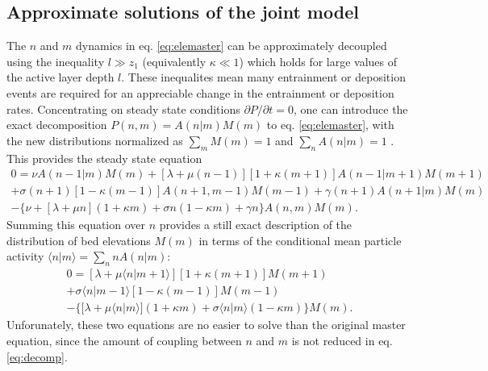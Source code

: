 \subsection{Approximate solutions of the joint model}
\label{sec:eleanalytical}

The $n$ and $m$ dynamics in eq. \ref{eq:elemaster} can be approximately decoupled using the inequality $l \gg z_1$ (equivalently $\kappa \ll 1$) which holds for large values of the active layer depth $l$.
These inequalites mean many entrainment or deposition events are required for an appreciable change in the entrainment or deposition rates.
Concentrating on steady state conditions $\partial P/\partial t = 0$, one can introduce the exact decomposition $P(n,m) = A(n|m)M(m)$ to eq. \ref{eq:elemaster}, with the new distributions normalized as $\sum_m M(m)=1$ and $\sum_n A(n|m)=1$ \citep[e.g.][]{Haken1978}.
This provides the steady state equation
\begin{multline}
	0 =  
	\nu A(n-1|m)M(m) + [\lambda + \mu(n-1)][1+\kappa(m+1)]A(n-1|m+1)M(m+1)\\  
	+ \sigma(n+1)[1-\kappa(m-1)]A(n+1,m-1)M(m-1) + \gamma(n+1)A(n+1|m)M(m) \\
	- 
	\{ \nu + [\lambda+ \mu n ](1+\kappa m) +  \sigma n ( 1- \kappa m) + \gamma n \}A(n,m)M(m).
	\label{eq:decomp}
\end{multline}
Summing this equation over $n$ provides a still exact description of the distribution of bed elevations $M(m)$ in terms of the conditional mean particle activity $\langle n | m \rangle = \sum_{n}nA(n|m)$:
\begin{multline}
	0 =  [\lambda + \mu\langle n | m+1\rangle][1+\kappa(m+1)]M(m+1)
	\\+ \sigma\langle n | m-1\rangle[1-\kappa(m-1)]M(m-1) \\
	- 
	\{  [\lambda+ \mu \langle n | m\rangle ](1+\kappa m) +  \sigma  \langle n | m\rangle( 1- \kappa m) \}M(m).
	\label{eq:approxele}
\end{multline}
Unforunately, these two equations are no easier to solve than the original master equation, since the amount of coupling between $n$ and $m$ is not reduced in eq. \ref{eq:decomp}.

